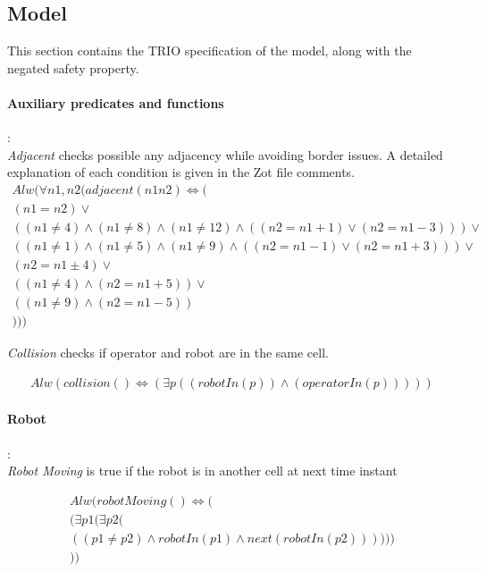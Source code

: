 \subsection{Model}
This section contains the TRIO specification of the model, along with the negated safety property.

\paragraph{Auxiliary predicates and functions}:\\

\textit{Adjacent} checks possible any adjacency while avoiding border issues. A detailed explanation of each condition is given in the Zot file comments.
\begin{align*}
	Alw(\forall n1,n2 (adjacent(n1 n2)\iff (\\
	(n1 = n2) \lor \\
	((n1 \neq 4)\land(n1 \neq 8)\land(n1 \neq 12)\land((n2=n1+1)\lor(n2=n1-3)))\lor \\
	((n1 \neq 1)\land(n1 \neq 5)\land(n1 \neq 9)\land((n2=n1-1)\lor(n2=n1+3)))\lor \\
	(n2 = n1\pm 4) \lor \\
	((n1 \neq 4)\land(n2 = n1+ 5)) \lor \\
	((n1 \neq 9)\land(n2 = n1- 5))  \\
	)))
\end{align*}

\textit{Collision} checks if operator and robot are in the same cell.

\begin{align*}
	Alw(collision()\iff (\exists p(
	(robotIn(p)) \land 
	(operatorIn(p)) 
	)))
\end{align*}


\paragraph{Robot}:\\

\textit{Robot Moving} is true if the robot is in another cell at next time instant

\begin{align*}
	Alw(robotMoving()\iff (\\
	(\exists p1(\exists p2 (\\
	((p1\neq p2)\land robotIn(p1) \land next(robotIn(p2))) )))\\
	))
\end{align*}

